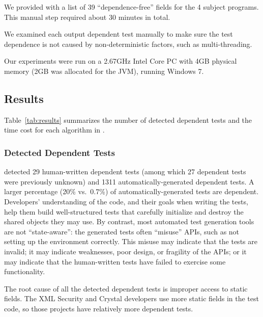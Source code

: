 We provided \ourtool with a list of 39 ``dependence-free'' fields
for the 4 subject programs. This manual step required
about 30 minutes in total.


We examined each output dependent test manually to make
sure the test dependence is not caused by non-deter\-min\-istic
factors, such as multi-threading.

Our experiments were run on a 2.67GHz Intel Core PC
with 4GB physical memory (2GB was allocated for the JVM),
running Windows 7.

\subsection{Results}

Table~\ref{tab:results} summarizes the number of detected
dependent tests and the time cost for each algorithm
in \ourtool.

\subsubsection{Detected Dependent Tests}
\label{sec:detectedtests}


\ourtool detected 29 human-written dependent tests (among which 27
dependent tests were previously unknown) and 1311
automatically-generated dependent tests.  A larger percentage
(20\% vs.\ 0.7\%) of
automatically-generated tests are dependent.  Developers' understanding of
the code, and their goals when writing the tests, help them build
well-structured tests that carefully initialize and destroy the shared
objects they may use.
By contrast,  most automated test generation tools are not ``state-aware'': the
generated tests often ``misuse'' APIs, such as not setting up
the environment correctly.  This misuse may
indicate that the tests are invalid; it may indicate weaknesses, poor
design, or fragility of the APIs; or it may indicate that the human-written
tests have failed to exercise some functionality.


The root cause of all the detected dependent tests is improper access to
static fields. The XML Security and Crystal developers use more
static fields in the test code,
so those projects have relatively more dependent tests.


